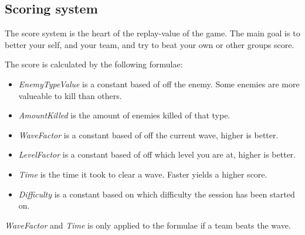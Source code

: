 \subsection{Scoring system}
The score system is the heart of the replay-value of the game. The main goal is to better your self, and your team, and try to beat your own or other groups score.

The score is calculated by the following formulae:

\begin{itemize}
\item \textit{EnemyTypeValue} is a constant based of off the enemy. Some enemies are more valueable to kill than others.
\item \textit{AmountKilled} is the amount of enemies killed of that type.
\item \textit{WaveFactor} is a constant based of off the current wave, higher is better.
\item \textit{LevelFactor} is a constant based of off which level you are at, higher is better.
\item \textit{Time} is the time it took to clear a wave. Faster yields a higher score.
\item \textit{Difficulty} is a constant based on which difficulty the session has been started on.
\end{itemize}

\emph{WaveFactor} and \emph{Time} is only applied to the formulae if a team beats the wave.

